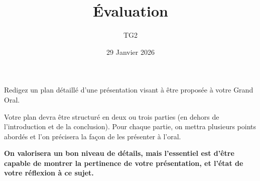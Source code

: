 \documentclass{controle}
\title{Évaluation}
\author{TG2}
\date{29 Janvier 2026}
\begin{document}
\titleandname{}

\begin{tcolorbox}
Redigez un plan détaillé d'une présentation visant à être proposée à votre Grand Oral.

\vspace*{0.5cm}

Votre plan devra être structuré en deux ou trois parties (en dehors de l'introduction et de la conclusion). Pour chaque partie, on mettra plusieurs points abordés et l'on précisera la façon de les présenter à l'oral.

\vspace*{0.5cm}

\textbf{On valorisera un bon niveau de détails, mais l'essentiel est d'être capable de montrer la pertinence de votre présentation, et l'état de votre réflexion à ce sujet.}
\end{tcolorbox}
\end{document}

